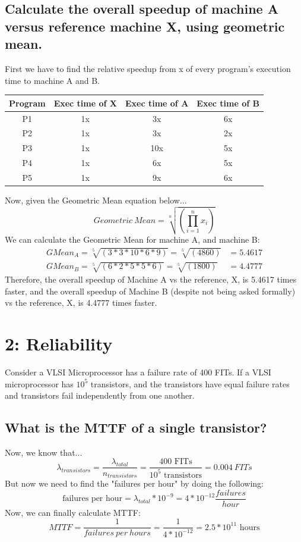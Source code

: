 \documentclass{article}
\begin{document}
\subsection{Calculate the overall speedup of machine A versus reference machine X, using geometric mean.}
First we have to find the relative speedup from x of every program's execution time to machine A and B.
\begin{table}[h]
  \centering
  \begin{tabular}{|c|c|c|c|}
    \hline
    Program & Exec time of X & Exec time of A & Exec time of B \\ \hline
    P1      & 1x             & 3x             & 6x             \\ \hline
    P2      & 1x             & 3x             & 2x             \\ \hline
    P3      & 1x             & 10x            & 5x             \\ \hline
    P4      & 1x             & 6x             & 5x             \\ \hline
    P5      & 1x             & 9x             & 6x             \\ \hline
  \end{tabular}
\end{table}
Now, given the Geometric Mean equation below...
$$ Geometric\ Mean = \sqrt[n]{\left( \prod_{i=1}^{n} x_i \right)} $$
We can calculate the Geometric Mean for machine A, and machine B:
\begin{align*}
  GMean_{A} = \sqrt[5]{\left( 3*3*10*6*9 \right)} = \sqrt[5]{\left( 4860 \right)} &= 5.4617 \\
  GMean_{B} = \sqrt[5]{\left( 6*2*5*5*6 \right)} = \sqrt[5]{\left( 1800 \right)}  &= 4.4777
\end{align*}
Therefore, the overall speedup of Machine A vs the reference, X, is 5.4617 times faster, and the overall speedup of Machine B (despite not being asked formally) vs the reference, X, is 4.4777 times faster.


\pagebreak
\section{2: Reliability}
Consider a VLSI Microprocessor has a failure rate of 400 FITs. If a VLSI microprocessor has $10^5$ transistors, and the transistors have equal failure rates and transistors fail independently from one another.

\subsection{What is the MTTF of a single transistor?}
Now, we know that...
$$ \lambda_{transistors} = \frac{\lambda_{total}}{n_{transistors}} = \frac{400 \text{ FITs}}{10^5 \text{ transistors}} = 0.004\ FITs $$
But now we need to find the "failures per hour" by doing the following:
$$ \text{failures per hour} = \lambda_{total} * 10^{-9} = 4*10^{-12} \frac{failures}{hour} $$
Now, we can finally calculate MTTF:
$$ MTTF = \frac{1}{failures\ per\ hours} = \frac{1}{4*10^{-12}} = 2.5*10^{11} \text{ hours} $$
\end{document}
